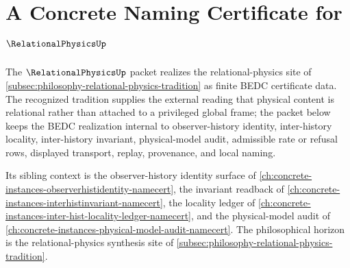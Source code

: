 \chapter{A Concrete Naming Certificate for $\RelationalPhysicsUp$}
\label{ch:concrete-instances-relational-physics-namecert}

The $\RelationalPhysicsUp$ packet realizes the relational-physics site of \autoref{subsec:philosophy-relational-physics-tradition} as finite BEDC certificate data. The recognized tradition supplies the external reading that physical content is relational rather than attached to a privileged global frame; the packet below keeps the BEDC realization internal to observer-history identity, inter-history locality, inter-history invariant, physical-model audit, admissible rate or refusal rows, displayed transport, replay, provenance, and local naming.

Its sibling context is the observer-history identity surface of \autoref{ch:concrete-instances-observerhistidentity-namecert}, the invariant readback of \autoref{ch:concrete-instances-interhistinvariant-namecert}, the locality ledger of \autoref{ch:concrete-instances-inter-hist-locality-ledger-namecert}, and the physical-model audit of \autoref{ch:concrete-instances-physical-model-audit-namecert}. The philosophical horizon is the relational-physics synthesis site of \autoref{subsec:philosophy-relational-physics-tradition}.


